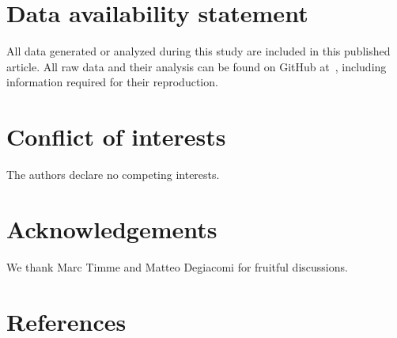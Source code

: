 \documentclass[10pt]{iopart}
\begin{document}
\section*{Data availability statement}
All data generated or analyzed during this study are included in this published article. All raw data and their analysis can be found on GitHub at~\cite{2022sequence}, including information required for their reproduction. 

\section*{Conflict of interests}
The authors declare no competing interests.
\section*{Acknowledgements}
We thank Marc Timme and Matteo Degiacomi for fruitful discussions.
\section*{References}


\end{document}
